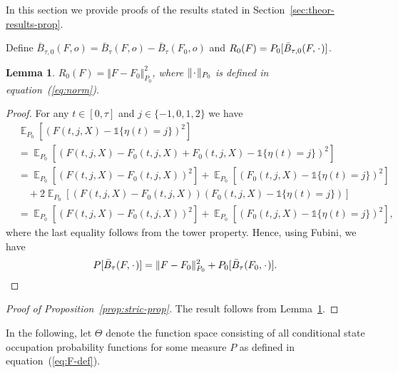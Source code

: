 \documentclass{statsoc}
\newtheorem{lemma}{Lemma}
\DeclareMathOperator{\E}{\mathbb{E}} %
\newcommand{\blank}{\makebox[1ex]{\textbf{$\cdot$}}}
\newcommand{\1}{\mathds{1}}
\begin{document}
In this section we provide proofs of the results stated in
Section~\ref{sec:theor-results-prop}.

Define
\( \bar{B}_{\tau,0}(F, o) = \bar{B}_{\tau}(F, o) - \bar{B}_{\tau}(F_0, o) \) and
\( R_{0}(F) = P_0{[\bar{B}_{\tau,0}(F, \blank)]} \).
\begin{lemma}
  \label{lemma:norm}
  \( R_{0}(F) = \Vert F - F_0 \Vert_{P_0}^2 \), where \( \Vert \blank \Vert_{P_0}\) is defined
  in equation~(\ref{eq:norm}).
\end{lemma}
\begin{proof}
  For any \( t \in [0, \tau] \) and \( j\in \{-1,0,1,2\} \) we have
  \begin{align*}
    & \E_{P_0}{\left[ (F(t, j, X) - \1{\{\eta(t) = j \}})^2 \right]}
    \\
    & =    \E_{P_0}{\left[ (F(t, j, X) - F_0(t, j, X) + F_0(t, j, X) - \1{\{\eta(t) = j
      \}})^2 \right]}
    \\
    & =    \E_{P_0}{\left[ (F(t, j, X) - F_0(t, j, X))^2\right]}
      + \E_{P_0}{\left[ (F_0(t, j, X) - \1{\{\eta(t) = j \}})^2\right]}
    \\
    & \quad
      + 2\E_{P_0}{\left[ (F(t, j, X) - F_0(t, j, X))(F_0(t, j, X) - \1{\{\eta(t) = j
      \}})\right]}
    \\
    & =    \E_{P_0}{\left[ (F(t, j, X) - F_0(t, j, X))^2\right]}
      + \E_{P_0}{\left[ (F_0(t, j, X) - \1{\{\eta(t) = j \}})^2\right]},
  \end{align*}
  where the last equality follows from the tower property. Hence, using Fubini,
  we have
  \begin{equation*}
    P{[\bar{B}_{\tau}(F, \blank)]}
    = \Vert F - F_0 \Vert_{P_0}^2 + P_0{[\bar{B}_{\tau}(F_0, \blank)]}.
  \end{equation*}
\end{proof}

\begin{proof}[Proof of Proposition~\ref{prop:stric-prop}]
  The result follows from Lemma~\ref{lemma:norm}.
\end{proof}

In the following, let $\Theta$ denote the function space consisting of all
conditional state occupation probability functions for some measure \( P \) as
defined in equation~(\ref{eq:F-def}).
\end{document}
